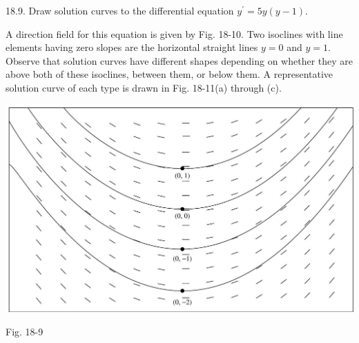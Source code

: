 \documentclass[10pt]{article}
\begin{document}
18.9. Draw solution curves to the differential equation $y^{\prime}=5 y(y-1)$.

A direction field for this equation is given by Fig. 18-10. Two isoclines with line elements having zero slopes are the horizontal straight lines $y=0$ and $y=1$. Observe that solution curves have different shapes depending on whether they are above both of these isoclines, between them, or below them. A representative solution curve of each type is drawn in Fig. 18-11(a) through (c).

\begin{center}
\includegraphics[max width=\textwidth]{2024_04_03_5bb5b4275a64cb9887d1g-182}
\end{center}

Fig. 18-9
\end{document}
